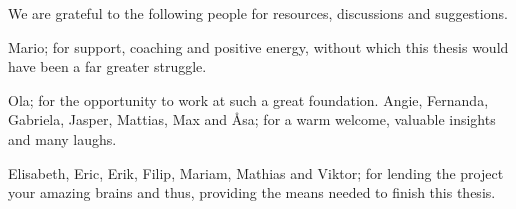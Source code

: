 \documentclass{acmtog} %
\begin{document}







\begin{acks}
We are grateful to the following people for resources, discussions and
suggestions.

Mario; for support, coaching and positive energy, without which this thesis would have been a far greater struggle.

Ola; for the opportunity to work at such a great foundation. Angie, Fernanda, Gabriela, Jasper, Mattias, Max and Åsa; for a warm welcome, valuable insights and many laughs. 

Elisabeth, Eric, Erik, Filip, Mariam, Mathias and Viktor; for lending the project your amazing brains and thus, providing the means needed to finish this thesis.
\end{acks}




\end{document}
